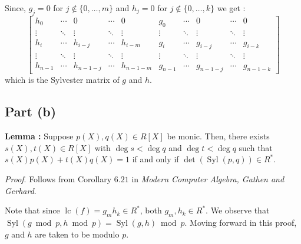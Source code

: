 Since, $g_j = 0$ for $j\notin \{0,\ldots, m\}$ and $h_j=0$ for $j\notin\{0,\ldots, k\}$ we get :
\[\begin{bmatrix} h_0 & \cdots & 0 & \cdots & 0 & g_0 & \cdots & 0 & \cdots & 0 \\
\vdots & \ddots &\vdots & \ddots& \vdots & \vdots & \ddots &\vdots & \ddots& \vdots \\
h_i &\cdots & h_{i-j} & \cdots & h_{i-m} & g_{i} & \cdots & g_{i-j} & \cdots & g_{i-k} \\
\vdots & \ddots &\vdots & \ddots& \vdots & \vdots & \ddots &\vdots & \ddots& \vdots \\
h_{n-1} & \cdots & h_{n-1-j} & \cdots & h_{n-1-m} & g_{n-1} & \cdots & g_{n-1-j} & \cdots & g_{n-1-k}\end{bmatrix}\]
which is the Sylvester matrix of $g$ and $h$.
\subsection{Part (b)}


\begin{thisnote}
    \textbf{Lemma : } Suppose $p(X),q(X)\in R[X]$ be monic. Then, there exists $s(X),t(X)\in R[X]$ with $\deg{s}<\deg{q}$ and $\deg{t}<\deg{q}$ such that $s(X)p(X) + t(X)q(X) = 1$ if and only if $\det(\operatorname{Syl}(p,q)) \in R^*$. 

    \textit{Proof}. Follows from Corollary $6.21$ in \textit{Modern Computer Algebra, Gathen and Gerhard}.
\end{thisnote}
\begin{thisnote1}
Note that since $\operatorname{lc}(f) = g_m h_k \in R^*$, both $g_m,h_k \in R^*$. We observe that $\operatorname{Syl}(g\bmod{p}, h\bmod{p}) = \operatorname{Syl}(g,h)\bmod{p}$. Moving forward in this proof, $g$ and $h$ are taken to be modulo $p$.
\end{thisnote1}

